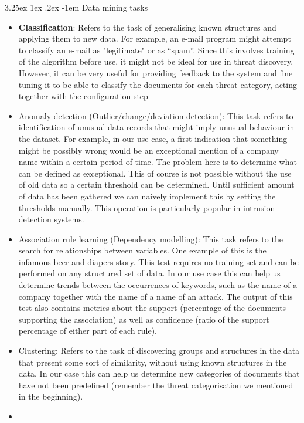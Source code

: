 \documentclass[12pt]{article}
\makeatletter
\renewcommand\paragraph{\@startsection{paragraph}{5}{\z@}%
  {3.25ex \@plus1ex \@minus.2ex}%
  {-1em}%
  {\normalfont\normalsize\bfseries}}
\makeatother
\begin{document}
\paragraph{Data mining tasks}
\begin{itemize}
\item 
\textbf{Classification}: Refers to the task of generalising known structures and applying them to new
data. For example, an e-mail program might attempt to classify an e-mail as "legitimate" or as
“spam”. Since this involves training of the algorithm before use, it might not be ideal for use in
threat discovery. However, it can be very useful for providing feedback to the system and fine
tuning it to be able to classify the documents for each threat category, acting together with the
configuration step
\item 
Anomaly detection (Outlier/change/deviation detection): This task refers to identification of
unusual data records that might imply unusual behaviour in the dataset. For example, in our
use case, a first indication that something might be possibly wrong would be an exceptional
mention of a company name within a certain period of time. The problem here is to determine
what can be defined as exceptional. This of course is not possible without the use of old data
so a certain threshold can be determined. Until sufficient amount of data has been gathered we
can naively implement this by setting the thresholds manually. This operation is particularly
popular in intrusion detection systems.
\item 
Association rule learning (Dependency modelling): This task refers to the search for
relationships between variables. One example of this is the infamous beer and diapers story.
This test requires no training set and can be performed on any structured set of data. In our
use case this can help us determine trends between the occurrences of keywords, such as the
name of a company together with the name of a name of an attack. The output of this test also
contains metrics about the support (percentage of the documents supporting the association) as well as
confidence (ratio of the support percentage of either part of each rule).
\item 
Clustering: Refers to the task of discovering groups and structures in the data that present
some sort of similarity, without using known structures in the data. In our case this can help us
determine new categories of documents that have not been predefined (remember the threat
categorisation we mentioned in the beginning).
\item

\end{itemize}
\end{document}
